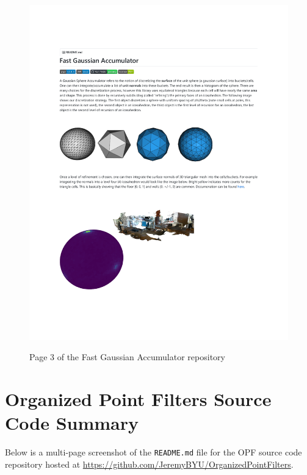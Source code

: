 \begin{figure}[h!]
    \centering\includegraphics[page=3, trim=1.0in 1.0in 1.0in 1.0in, width=.93\linewidth]{appendix_1/imgs/FastGAReadme.pdf}
    \label{fig:apx1_fg3}
    \caption{Page 3 of the Fast Gaussian Accumulator repository} 
\end{figure}

\newpage

\section{Organized Point Filters Source Code Summary} 
Below is a multi-page screenshot of the \texttt{README.md} file for the OPF source code repository hosted at \url{https://github.com/JeremyBYU/OrganizedPointFilters}.

